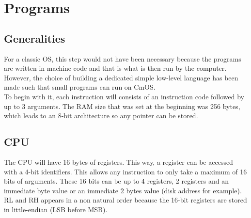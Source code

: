 \documentclass[a4paper,12pt]{article}
\begin{document}
\section{Programs}

\subsection{Generalities}

For a classic OS, this step would not have been necessary because the programs are written in machine code and that is what is then run by the computer. However, the choice of building a dedicated simple low-level language has been made such that small programs can run on CmOS.\\
To begin with it, each instruction will consists of an instruction code followed by up to 3 arguments. The RAM size that was set at the beginning was 256 bytes, which leads to an 8-bit architecture so any pointer can be stored.

\subsection{CPU}

The CPU will have 16 bytes of registers. This way, a register can be accessed with a 4-bit identifiers. This allows any instruction to only take a maximum of 16 bits of arguments. These 16 bits can be up to 4 registers, 2 registers and an immediate byte value or an immediate 2 bytes value (disk address for example).\\
RL and RH appears in a non natural order because the 16-bit registers are stored in little-endian (LSB before MSB).
\end{document}
